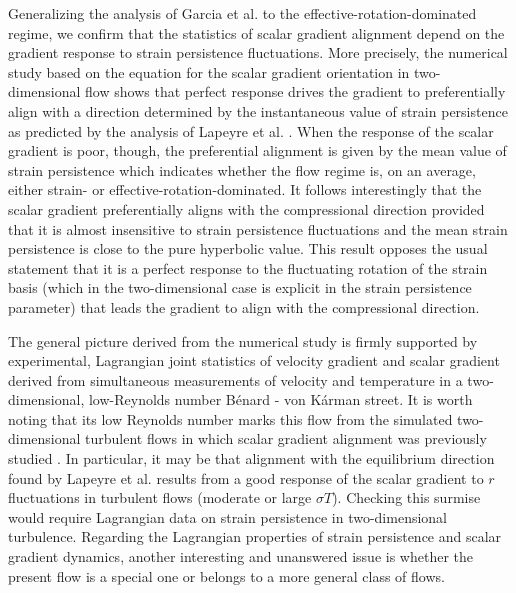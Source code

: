 \documentclass[doublespacing]{elsart}
\begin{document}
Generalizing the analysis of Garcia 
et al. \cite{Gal05} to the effective-rotation-domina\-ted
regime, we confirm that the statistics of scalar gradient
alignment depend on the gradient response to strain
persistence fluctuations.
More precisely, the numerical study based on the equation for
the scalar gradient orientation in two-dimensional flow
shows that perfect response 
drives the gradient to preferentially
align 
with a direction determined 
by the instantaneous value of strain persistence
as predicted by the analysis of Lapeyre et al. \cite{Lal99}.
When the response of the scalar gradient is poor, though,
the preferential alignment is given by the mean value
of strain persistence
which indicates whether the flow regime is, on an average,  
either strain- or effective-rotation-dominated.
It follows interestingly
that 
the scalar gradient
preferentially aligns with the compressional direction
provided that
it is almost insensitive to
strain persistence fluctuations
and
the mean strain persistence is close
to the pure hyperbolic value.
This result opposes the usual statement that it is
a
perfect response to the fluctuating rotation
of the strain basis (which in the two-dimensional case is explicit
in the strain persistence parameter) that 
leads the gradient to align with the compressional direction.

The general picture derived from the numerical study
is firmly supported by experimental, Lagrangian          
joint statistics of velocity gradient and scalar gradient
derived from simultaneous measurements of velocity
and temperature in a two-dimensional, low-Reynolds
number
B\'enard - von K\'arman street.
It is worth noting that its low Reynolds number  
marks this flow from the simulated two-dimensional turbulent flows
in which
scalar gradient alignment was previously studied
\cite{Lal99,Lal01}.
In particular, it may be that alignment with the equilibrium
direction found by Lapeyre et al. \cite{Lal99} results from
a good response of the scalar gradient to $ r $ fluctuations
in turbulent flows (moderate or large $ \sigma T $). Checking 
this surmise would require Lagrangian data on strain persistence
in two-dimensional turbulence.
Regarding the Lagrangian 
properties of strain persistence and scalar gradient
dynamics,
another interesting and unanswered  issue is whether the
present flow is a special one 
or belongs to a more general class of flows.
\end{document}
